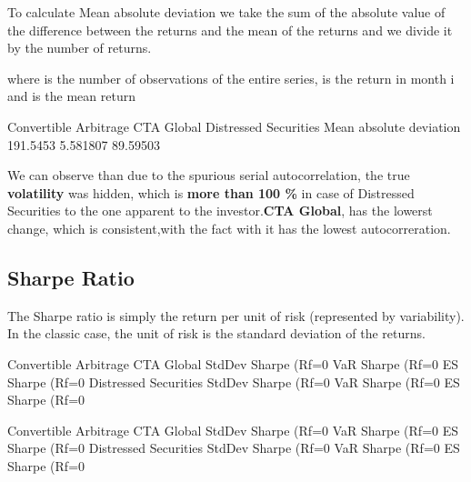 \documentclass[12pt,letterpaper,english]{article}
\begin{document}
To calculate Mean absolute deviation we take the sum of the absolute value of the difference between the returns and the mean of the returns and we divide it by the number of returns.


where  is the number of observations of the entire series,  is the return in month i and  is the mean return

\begin{Schunk}
\begin{Soutput}
                        Convertible Arbitrage CTA Global Distressed Securities
Mean absolute deviation              191.5453   5.581807              89.59503
\end{Soutput}
\end{Schunk}

We can observe than due to the spurious serial autocorrelation, the true \textbf{volatility} was hidden, which is \textbf{more than 100 \% } in case of Distressed Securities to the one apparent to the investor.\textbf{CTA Global}, has the lowerst change, which is consistent,with the fact with it has the lowest autocorreration.


\subsection{Sharpe Ratio}

The Sharpe ratio is simply the return per unit of risk (represented by variability).  In the classic case, the unit of risk is the standard deviation of the returns.
 

\begin{Schunk}
\begin{Soutput}
                              Convertible Arbitrage CTA Global
StdDev Sharpe (Rf=0%
VaR Sharpe (Rf=0%
ES Sharpe (Rf=0%
                              Distressed Securities
StdDev Sharpe (Rf=0%
VaR Sharpe (Rf=0%
ES Sharpe (Rf=0%
\end{Soutput}
\begin{Soutput}
                              Convertible Arbitrage CTA Global
StdDev Sharpe (Rf=0%
VaR Sharpe (Rf=0%
ES Sharpe (Rf=0%
                              Distressed Securities
StdDev Sharpe (Rf=0%
VaR Sharpe (Rf=0%
ES Sharpe (Rf=0%
\end{Soutput}
\end{Schunk}
\end{document}
